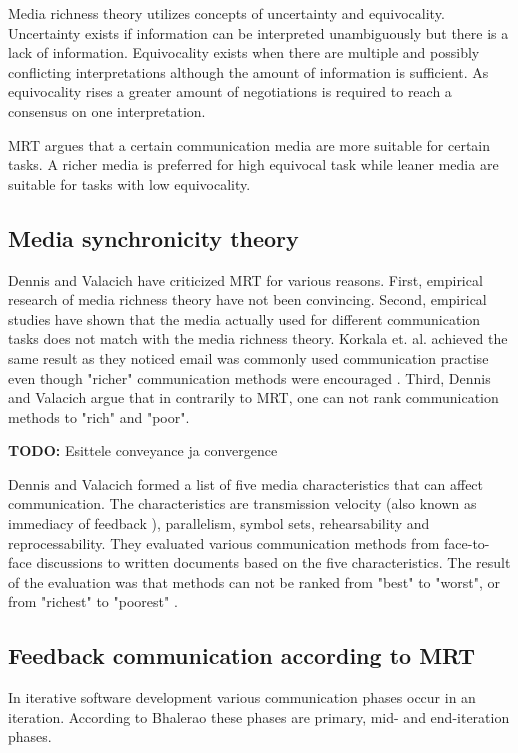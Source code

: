 \documentclass[conference]{IEEEtran}
\begin{document}
Media richness theory utilizes concepts of uncertainty and equivocality. Uncertainty exists if information can be interpreted unambiguously but there is a lack of information. Equivocality exists when there are multiple and possibly conflicting interpretations although the amount of information is sufficient. As equivocality rises a greater amount of negotiations is required to reach a consensus on one interpretation. \cite{1999dennis}

MRT argues that a certain communication media are more suitable for certain tasks. A richer media is preferred for high equivocal task while leaner media are suitable for tasks with low equivocality. \cite{1999dennis}

\subsection{Media synchronicity theory}

Dennis and Valacich have criticized MRT for various reasons. First, empirical research of media richness theory have not been convincing. Second, empirical studies have shown that the media actually used for different communication tasks does not match with the media richness theory. Korkala et. al. achieved the same result as they noticed email was commonly used communication practise even though "richer" communication methods were encouraged \cite{2006korkala}. Third, Dennis and Valacich argue that in contrarily to MRT, one can not rank communication methods to "rich" and "poor". \cite{1999dennis}

\textbf{TODO:} Esittele conveyance ja convergence

Dennis and Valacich formed a list of five media characteristics that can affect communication. The characteristics are transmission velocity (also known as immediacy of feedback \cite{1999dennis}), parallelism, symbol sets, rehearsability and reprocessability. They evaluated various communication methods from face-to-face discussions to written documents based on the five characteristics. The result of the evaluation was that methods can not be ranked from "best" to "worst", or from "richest" to "poorest" \cite{2008dennis}. 

\subsection{Feedback communication according to MRT}

In iterative software development various communication phases occur in an iteration. According to Bhalerao these phases are primary, mid- and end-iteration phases. \cite{2010bhalerao}
\end{document}
